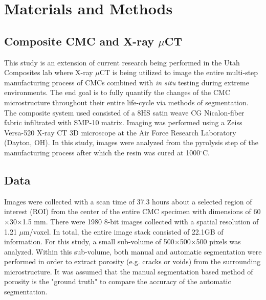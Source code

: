 \documentclass[11pt, twocolumn]{article}
\begin{document}
\section{Materials and Methods}

\subsection{Composite CMC and X-ray $\mu$CT}
This study is an extension of current research being performed in the Utah Composites lab where X-ray $\mu$CT is being utilized to image the entire multi-step manufacturing process of CMCs combined with \textit{in situ} testing during extreme environments. The end goal is to fully quantify the changes of the CMC microstructure throughout their entire life-cycle via methods of segmentation. The composite system used consisted of a 8HS satin weave CG Nicalon-fiber fabric infiltrated with SMP-10 matrix. Imaging was performed using a Zeiss Versa-520 X-ray CT 3D microscope at the Air Force Research Laboratory (Dayton, OH). In this study, images were analyzed from the pyrolysis step of the manufacturing process after which the resin was cured at 1000$^{\circ}$C.

\subsection{Data}
Images were collected with a scan time of 37.3 hours about a selected region of interest (ROI) from the center of the entire CMC specimen with dimensions of 60$\times$30$\times$1.5 mm. There were 1980 8-bit images collected with a spatial resolution of 1.21 $\mu$m/voxel. In total, the entire image stack consisted of 22.1GB of information. For this study, a small sub-volume of 500$\times$500$\times$500 pixels was analyzed. Within this sub-volume, both manual and automatic segmentation were performed in order to extract porosity (e.g. cracks or voids) from the surrounding microstructure. It was assumed that the manual segmentation based method of porosity is the "ground truth" to compare the accuracy of the automatic segmentation.
\end{document}

